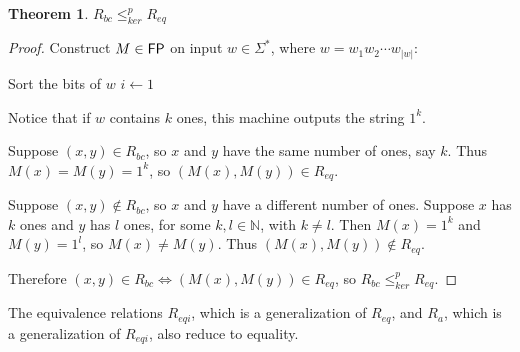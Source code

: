 \documentclass{amsart}
\newtheorem{theorem}{Theorem}[section]
\theoremstyle{definition} \newtheorem{definition}[definition]{Definition}
\newcommand{\sigmastar}{\Sigma^{*}} %
\newcommand{\kr}{\leq^{p}_{ker}} %
\begin{document}
\begin{theorem}$R_{bc}\kr R_{eq}$\end{theorem}
\begin{proof}
  Construct $M\in {\ensuremath{\mathsf{FP}}}$ on input $w\in\sigmastar$, where $w=w_1w_2\cdots
  w_{|w|}$:\\
  \begin{algorithm}[H]
    Sort the bits of $w$\;
    $i\gets1$\;
  \end{algorithm}
  Notice that if $w$ contains $k$ ones, this machine outputs the string $1^k$.

  Suppose $(x, y)\in R_{bc}$, so $x$ and $y$ have the same number of ones, say
  $k$. Thus $M(x)=M(y)=1^k$, so $(M(x), M(y))\in R_{eq}$.
  
  Suppose $(x, y)\notin R_{bc}$, so $x$ and $y$ have a different number of
  ones. Suppose $x$ has $k$ ones and $y$ has $l$ ones, for some
  $k,l\in\mathbb{N}$, with $k\neq l$. Then $M(x)=1^{k}$ and $M(y)=1^{l}$, so
  $M(x)\neq M(y)$. Thus $(M(x), M(y))\notin R_{eq}$.

  Therefore $(x, y)\in R_{bc} \iff (M(x), M(y))\in R_{eq}$, so $R_{bc}\kr
  R_{eq}$.
\end{proof}

The equivalence relations $R_{eqi}$, which is a generalization of $R_{eq}$, and
$R_a$, which is a generalization of $R_{eqi}$, also reduce to equality.
\end{document}
